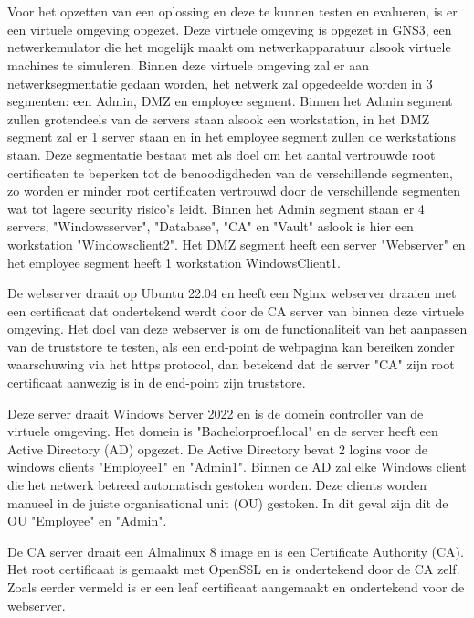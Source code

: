 \chapter{}%
\label{ch:proof-of-concept}
\label{sec:Virtuele omgeving}

Voor het opzetten van een oplossing en deze te kunnen testen en evalueren, is er een virtuele omgeving opgezet.
Deze virtuele omgeving is opgezet in GNS3, een netwerkemulator die het mogelijk maakt om netwerkapparatuur alsook virtuele machines te simuleren.
Binnen deze virtuele omgeving zal er aan netwerksegmentatie gedaan worden, het netwerk zal opgedeelde worden in 3 segmenten: een Admin, DMZ en employee segment.
Binnen het Admin segment zullen grotendeels van de servers staan alsook een workstation, in het DMZ segment zal er 1 server staan en in het employee segment zullen de werkstations staan.
Deze segmentatie bestaat met als doel om het aantal vertrouwde root certificaten te beperken tot de benoodigdheden van de verschillende segmenten, zo worden er minder root certificaten vertrouwd door de verschillende segmenten wat tot lagere security risico's leidt.
Binnen het Admin segment staan er 4 servers, "Windowsserver", "Database", "CA" en "Vault" aslook is hier een workstation "Windowsclient2". Het DMZ segment heeft een server "Webserver" en het employee segment heeft 1 workstation WindowsClient1. \nabla

\label{sec:Webserver}
De webserver draait op Ubuntu 22.04 en heeft een Nginx webserver draaien met een certificaat dat ondertekend werdt door de CA server van binnen deze virtuele omgeving.
Het doel van deze webserver is om de functionaliteit van het aanpassen van de truststore te testen, als een end-point de webpagina kan bereiken zonder waarschuwing via het https protocol, dan betekend dat de server "CA" zijn root certificaat aanwezig is in de end-point zijn truststore.

\label{sec:Windows server}
Deze server draait Windows Server 2022 en is de domein controller van de virtuele omgeving. Het domein is "Bachelorproef.local" en de server heeft een Active Directory (AD) opgezet. De Active Directory bevat 2 logins voor de windows clients "Employee1" en "Admin1". Binnen de AD zal elke Windows client die het netwerk betreed automatisch gestoken worden. 
Deze clients worden manueel in de juiste organisational unit (OU) gestoken. In dit geval zijn dit de OU "Employee" en "Admin".

\label{sec:CA}
De CA server draait een Almalinux 8 image en is een Certificate Authority (CA). Het root certificaat is gemaakt met OpenSSL en is ondertekend door de CA zelf. Zoals eerder vermeld is er een leaf certificaat aangemaakt en ondertekend voor de webserver.

